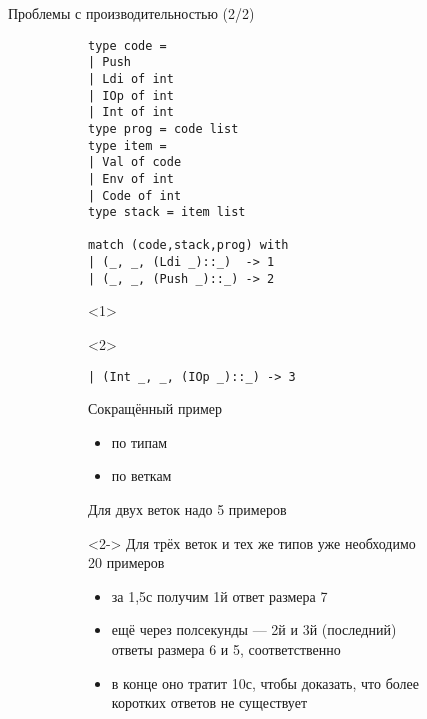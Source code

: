 \documentclass[aspectratio=169
  , xcolor={svgnames}
  , hyperref={ colorlinks,citecolor=Blue
             , linkcolor=DarkRed,urlcolor=DarkBlue}
  , russian
  ]{beamer}
\begin{document}
\begin{frame}[fragile]{Проблемы с производительностью (2/2)}
\begin{figure}
\begin{subfigure}[b][7cm][b]{0.35\linewidth}\vspace{0em}
\begin{lstlisting}[basicstyle=\small]
type code = 
| Push 
| Ldi of int 
| IOp of int 
| Int of int 
type prog = code list 
type item = 
| Val of code 
| Env of int 
| Code of int
type stack = item list 

match (code,stack,prog) with
| (_, _, (Ldi _)::_)  -> 1
| (_, _, (Push _)::_) -> 2
\end{lstlisting}
\begin{onlyenv}<1>
\vspace{4mm}
\end{onlyenv}
\begin{onlyenv}<2>
\begin{lstlisting}[basicstyle=\small,aboveskip=-0.5em]
| (Int _, _, (IOp _)::_) -> 3
\end{lstlisting}
\end{onlyenv}
\end{subfigure}
\hspace{.5cm}
\begin{subfigure}[b]{0.65\linewidth}
\begin{overlayarea}{8cm}{6cm}
Сокращённый пример 
\begin{itemize}
\item по типам 
\item по веткам
\end{itemize}
Для двух веток  надо 5 примеров\\\vspace{1em}

\begin{onlyenv}<2->
Для трёх веток и тех же типов уже необходимо 20 примеров
\begin{itemize}
\item за 1,5с получим 1й ответ размера 7
\item ещё через полсекунды --- 2й и 3й (последний) ответы размера 6 и 5, соответственно
\item в конце оно тратит 10с, чтобы доказать, что более коротких ответов не существует
\end{itemize}
\end{onlyenv}
\end{overlayarea}
\vspace{1cm}
\end{subfigure}
\end{figure}

\end{frame}
\end{document}
